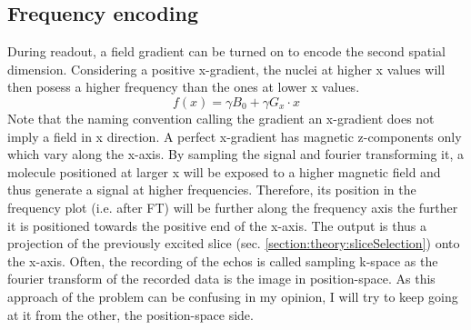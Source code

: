         \subsection{Frequency encoding}
            During readout, a field gradient can be turned on to encode the second spatial dimension. Considering a positive x-gradient, the nuclei at higher x values will then posess a higher frequency than the ones at lower x values.
            \begin{equation}
                f(x) = \gamma B_0 + \gamma G_x \cdot x
            \end{equation}
            Note that the naming convention calling the gradient an x-gradient does not imply a field in x direction. A perfect x-gradient has magnetic z-components only which vary along the x-axis. By sampling the signal and fourier transforming it, a molecule positioned at larger x will be exposed to a higher magnetic field and thus generate a signal at higher frequencies. Therefore, its position in the frequency plot (i.e. after FT) will be further along the frequency axis the further it is positioned towards the positive end of the x-axis. The output is thus a projection of the previously excited slice (sec. \ref{section:theory:sliceSelection}) onto the x-axis.
            Often, the recording of the echos is called sampling k-space as the fourier transform of the recorded data is the image in position-space. As this approach of the problem can be confusing in my opinion, I will try to keep going at it from the other, the position-space side.
